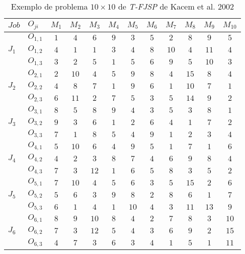 \begin{table}[htb]
    \centering
    \caption{Exemplo de problema $10\times10$ de \textit{T-FJSP} de Kacem et al. 2002}
    \label{fig:ex-instancia-problema-FJSP}
    \begin{tabular}[t]{llcccccccccc}
\hline
$Job$&$O_{ji}$&$M_1$&$M_2$&$M_3$&$M_4$&$M_5$&$M_6$&$M_7$&$M_8$&$M_9$&$M_{10}$\\
\hline
\multirow{3}{*}{$J_1$}&$O_{1,1}$ & $1$ & $4$ & $6$ & $9$ & $3$ & $5$ & $2$ & $8$ & $9$ & $5$\\
&$O_{1,2}$ & $4$ & $1$ & $1$ & $3$ & $4$ & $8$ & $10$ & $4$ & $11$ & $4$\\
&$O_{1,3}$ & $3$ & $2$ & $5$ & $1$ & $5$ & $6$ & $9$ & $5$ & $10$ & $3$\\
\multirow{3}{*}{$J_2$}&$O_{2,1}$ & $2$ & $10$ & $4$ & $5$ & $9$ & $8$ & $4$ & $15$ & $8$ & $4$\\
&$O_{2,2}$ & $4$ & $8$ & $7$ & $1$ & $9$ & $6$ & $1$ & $10$ & $7$ & $1$\\
&$O_{2,3}$ & $6$ & $11$ & $2$ & $7$ & $5$ & $3$ & $5$ & $14$ & $9$ & $2$\\
\multirow{3}{*}{$J_3$}&$O_{3,1}$ & $8$ & $5$ & $8$ & $9$ & $4$ & $3$ & $5$ & $3$ & $8$ & $1$\\
&$O_{3,2}$ & $9$ & $3$ & $6$ & $1$ & $2$ & $6$ & $4$ & $1$ & $7$ & $2$\\
&$O_{3,3}$ & $7$ & $1$ & $8$ & $5$ & $4$ & $9$ & $1$ & $2$ & $3$ & $4$\\
\multirow{3}{*}{$J_4$}&$O_{4,1}$ & $5$ & $10$ & $6$ & $4$ & $9$ & $5$ & $1$ & $7$ & $1$ & $6$\\
&$O_{4,2}$ & $4$ & $2$ & $3$ & $8$ & $7$ & $4$ & $6$ & $9$ & $8$ & $4$\\
&$O_{4,3}$ & $7$ & $3$ & $12$ & $1$ & $6$ & $5$ & $8$ & $3$ & $5$ & $2$\\
\multirow{3}{*}{$J_5$}&$O_{5,1}$ & $7$ & $10$ & $4$ & $5$ & $6$ & $3$ & $5$ & $15$ & $2$ & $6$\\
&$O_{5,2}$ & $5$ & $6$ & $3$ & $9$ & $8$ & $2$ & $8$ & $6$ & $1$ & $7$\\
&$O_{5,3}$ & $6$ & $1$ & $4$ & $1$ & $10$ & $4$ & $3$ & $11$ & $13$ & $9$\\
\multirow{3}{*}{$J_6$}&$O_{6,1}$ & $8$ & $9$ & $10$ & $8$ & $4$ & $2$ & $7$ & $8$ & $3$ & $10$\\
&$O_{6,2}$ & $7$ & $3$ & $12$ & $5$ & $4$ & $3$ & $6$ & $9$ & $2$ & $15$\\
&$O_{6,3}$ & $4$ & $7$ & $3$ & $6$ & $3$ & $4$ & $1$ & $5$ & $1$ & $11$\\

\end{tabular}
\end{table}
